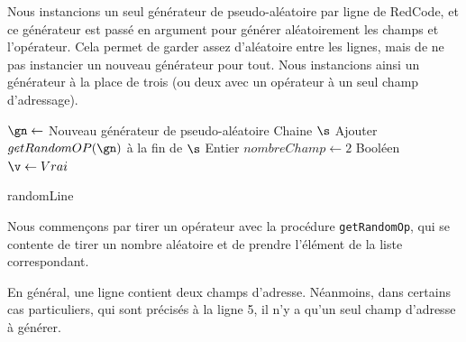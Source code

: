 \documentclass[hidelinks]{report}
\begin{document}
Nous instancions un seul générateur de pseudo-aléatoire par ligne de RedCode, et ce générateur est passé en argument pour générer aléatoirement les champs et l'opérateur. Cela permet de garder assez d'aléatoire entre les lignes, mais de ne pas instancier un nouveau générateur pour tout. Nous instancions ainsi un générateur à la place de trois (ou deux avec un opérateur à un seul champ d'adressage).
\LinesNumbered
\begin{algorithm}
\DontPrintSemicolon
{}
$\gn \gets$ Nouveau générateur de pseudo-aléatoire\;
Chaine $\s$\;
Ajouter $getRandomOP(\gn)$ à la fin de $\s$\;
Entier $nombreChamp \gets 2$\;
Booléen $\v \gets Vrai$\;

\caption{\sc randomLine}
\label{algo:randomL}
\end{algorithm}

Nous commençons par tirer un opérateur avec la procédure \texttt{getRandomOp}, qui se contente de tirer un nombre aléatoire et de prendre l'élément de la liste correspondant.

En général, une ligne contient deux champs d'adresse. Néanmoins, dans certains cas particuliers, qui sont précisés à la ligne 5, il n'y a qu'un seul champ d'adresse à générer.
\end{document}
